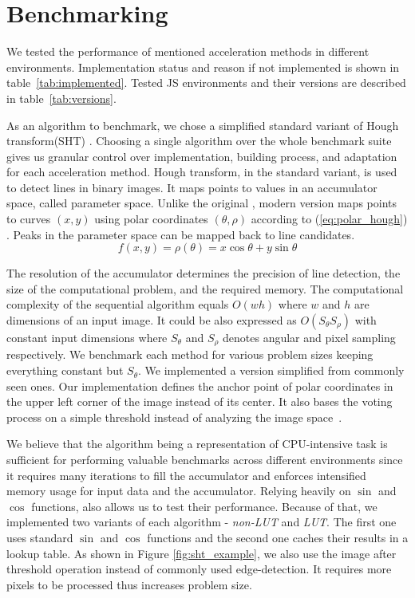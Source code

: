 \section{Benchmarking}\label{sec:benchmarking}

We tested the performance of mentioned acceleration methods in different environments. Implementation status and reason if not implemented is shown in table~\ref{tab:implemented}. Tested JS environments and their versions are described in table~\ref{tab:versions}.


As an algorithm to benchmark, we chose a simplified standard variant of Hough transform(SHT) \cite{mukhopadhyay2015survey}. Choosing a single algorithm over the whole benchmark suite gives us granular control over implementation, building process, and adaptation for each acceleration method. Hough transform, in the standard variant, is used to detect lines in binary images. It maps points to values in an accumulator space, called parameter space. Unlike the original \cite{hough1962method}, modern version maps points to curves $(x, y)$ using polar coordinates $(\theta, \rho)$ according to (\ref{eq:polar_hough}) \cite{duda1972use}.
Peaks in the parameter space can be mapped back to line candidates.
\begin{equation}
    \label{eq:polar_hough}
    f(x,y) = \rho(\theta) = x\cos{\theta}+y\sin{\theta}
\end{equation}


The resolution of the accumulator determines the precision of line detection, the size of the computational problem, and the required memory. The computational complexity of the sequential algorithm equals $O(wh)$ where $w$ and $h$ are dimensions of an input image. It could be also expressed as $O(S_{\theta} S_\rho)$ with constant input dimensions where $S_{\theta}$ and $S_\rho$ denotes angular and pixel sampling respectively. We benchmark each method for various problem sizes keeping everything constant but $S_\theta$. We implemented a version simplified from commonly seen ones. Our implementation defines the anchor point of polar coordinates in the upper left corner of the image instead of its center. It also bases the voting process on a simple threshold instead of analyzing the image space~\cite{palmer1997optimizing}.


We believe that the algorithm being a representation of CPU-intensive task is sufficient for performing valuable benchmarks across different environments since it requires many iterations to fill the accumulator and enforces intensified memory usage for input data and the accumulator. Relying heavily on $\sin$ and $\cos$ functions, also allows us to test their performance. Because of that, we implemented two variants of each algorithm - \textit{non-LUT} and \textit{LUT}. The first one uses standard $\sin$ and $\cos$ functions and the second one caches their results in a lookup table. As shown in Figure \ref{fig:sht_example}, we also use the image after threshold operation instead of commonly used edge-detection. It requires more pixels to be processed thus increases problem size.


